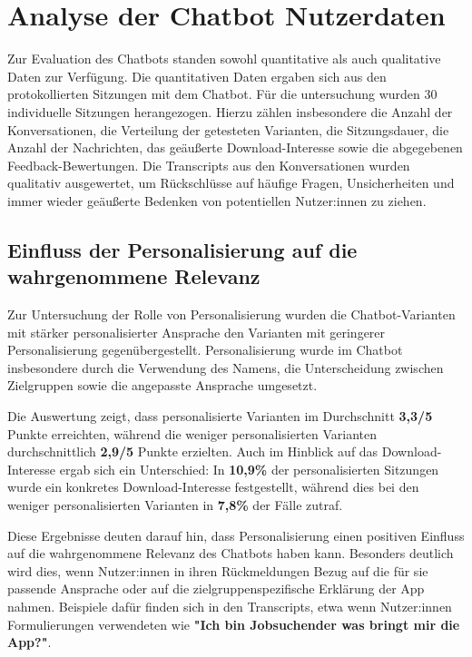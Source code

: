 \setauthor{\secondauthor}
\section{Analyse der Chatbot Nutzerdaten}

Zur Evaluation des Chatbots standen sowohl quantitative als auch qualitative 
Daten zur Verfügung. Die quantitativen Daten ergaben sich aus den protokollierten 
Sitzungen mit dem Chatbot. Für die untersuchung wurden 30 individuelle Sitzungen herangezogen.
Hierzu zählen insbesondere die Anzahl der 
Konversationen, die Verteilung der getesteten Varianten, die Sitzungsdauer, die 
Anzahl der Nachrichten, das geäußerte Download-Interesse sowie die abgegebenen 
Feedback-Bewertungen. Die Transcripts aus den Konversationen wurden qualitativ 
ausgewertet, um Rückschlüsse auf häufige Fragen, Unsicherheiten und immer wieder 
geäußerte Bedenken von potentiellen Nutzer:innen zu ziehen.

\subsection{Einfluss der Personalisierung auf die wahrgenommene Relevanz}

Zur Untersuchung der Rolle von Personalisierung wurden die Chatbot-Varianten
mit stärker personalisierter Ansprache den Varianten mit geringerer
Personalisierung gegenübergestellt. Personalisierung wurde im Chatbot
insbesondere durch die Verwendung des Namens, die Unterscheidung zwischen
Zielgruppen sowie die angepasste Ansprache umgesetzt.

Die Auswertung zeigt, dass personalisierte Varianten im Durchschnitt
\textbf{3,3/5}
Punkte erreichten, während die weniger personalisierten Varianten
durchschnittlich \textbf{2,9/5}
Punkte erzielten. Auch im Hinblick auf das Download-Interesse ergab sich ein
Unterschied: In \textbf{10,9\%}
der personalisierten Sitzungen wurde ein konkretes Download-Interesse
festgestellt, während dies bei den weniger personalisierten Varianten in
\textbf{7,8\%} der Fälle zutraf.

Diese Ergebnisse deuten darauf hin, dass Personalisierung einen positiven
Einfluss auf die wahrgenommene Relevanz des Chatbots haben kann. Besonders
deutlich wird dies, wenn Nutzer:innen in ihren Rückmeldungen Bezug auf die
für sie passende Ansprache oder auf die zielgruppenspezifische Erklärung der
App nahmen. Beispiele dafür finden sich in den Transcripts, etwa wenn
Nutzer:innen Formulierungen verwendeten wie
\textbf{"Ich bin Jobsuchender was bringt mir die App?"}.

